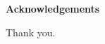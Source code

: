 \newpage
\pagestyle{empty}

\null {}
\begin{Large}\textbf{Acknowledgements}\end{Large}
\vspace{15mm}


Thank you.

 \null
